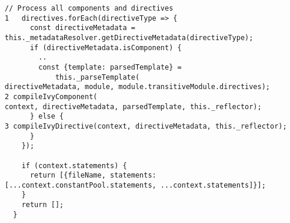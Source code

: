 \begin{verbatim}
// Process all components and directives
1   directives.forEach(directiveType => {
      const directiveMetadata =
this._metadataResolver.getDirectiveMetadata(directiveType);
      if (directiveMetadata.isComponent) {
        ..
        const {template: parsedTemplate} =
            this._parseTemplate(
directiveMetadata, module, module.transitiveModule.directives);
2 compileIvyComponent(
context, directiveMetadata, parsedTemplate, this._reflector);
      } else {
3 compileIvyDirective(context, directiveMetadata, this._reflector);
      }
    });

    if (context.statements) {
      return [{fileName, statements:
[...context.constantPool.statements, ...context.statements]}];
    }
    return [];
  }
\end{verbatim}
